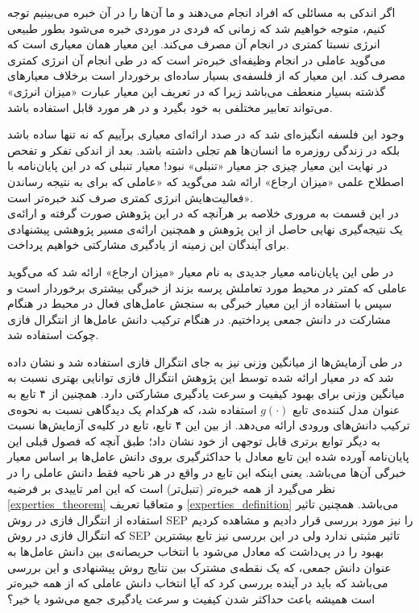 اگر اندکی به مسائلی که افراد انجام می‌دهند و ما آن‌ها را در آن خبره می‌بینیم توجه کنیم، متوجه خواهیم شد که زمانی که فردی در موردی خبره می‌شود بطور طبیعی انرژی نسبتا کمتری در انجام آن مصرف می‌کند. این معیار همان معیاری است که می‌گوید عاملی در انجام وظیفه‌ای خبره‌تر است که در طی انجام آن انرژی کمتری مصرف کند. این معیار که از فلسفه‌ی بسیار ساده‌ای برخوردار است برخلاف معیار‌های گذشته بسیار منعطف می‌باشد زیرا که در تعریف این معیار عبارت «میزان انرژی» می‌تواند تعابیر مختلفی به خود بگیرد و در هر مورد قابل استفاده باشد.

وجود این فلسفه انگیزه‌ای شد که در صدد ارائه‌ای معیاری برآییم که نه تنها ساده باشد بلکه در زندگی روزمره ما انسان‌ها هم تجلی داشته باشد. بعد از اندکی تفکر و تفحص در نهایت این معیار چیزی جز معیار «تنبلی» نبود! معیار تنبلی که در این پایان‌نامه با اصطلاح علمی «میزان ارجاع» ارائه شد می‌گوید که «عاملی که برای به نتیجه رساندن فعالیت‌هایش انرژی کمتری صرف کند خبره‌تر است».\\
در این قسمت به مروری خلاصه بر هرآنچه که در این پژوهش صورت گرفته و ارائه‌ی یک نتیجه‌گیری نهایی حاصل از این پژوهش و همچنین ارائه‌ی مسیر پژوهشی پیشنهادی برای آیندگان این زمینه از یادگیری مشارکتی خواهیم پرداخت.

در طی این پایان‌نامه معیار جدیدی به نام معیار «میزان ارجاع» ارائه شد که می‌گوید عاملی که کمتر در محیط مورد تعاملش پرسه بزند از خبرگی بیشتری برخوردار است و سپس با استفاده از این معیار خبرگی به سنجش عامل‌های فعال در محیط در هنگام مشارکت در دانش جمعی پرداختیم. در هنگام ترکیب دانش عامل‌ها از انتگرال فازی چوکت استفاده شد.

در طی آزمایش‌ها از میانگین وزنی نیز به جای انتگرال فازی استفاده شد و نشان داده شد که در معیار ارائه شده توسط این پژوهش انتگرال فازی توانایی بهتری نسبت به میانگین وزنی برای بهبود کیفیت و سرعت یادگیری مشارکتی دارد. همچنین از ۴ تابع به عنوان مدل کننده‌ی تابع $g(\cdot)$ استفاده شد، که هرکدام یک دیدگاهی نسبت به نحوه‌ی ترکیب دانش‌های ورودی ارائه می‌دهد. از بین این ۴ تابع، تابع  در کلیه‌ی آزمایش‌ها نسبت به دیگر توابع برتری قابل توجهی از خود نشان داد؛ طبق آنچه که فصول قبلی این پایان‌نامه آورده شده این تابع معادل با حداکثرگیری بروی دانش عامل‌ها بر اساس معیار خبرگی آن‌ها می‌باشد. یعنی اینکه این تابع در واقع در هر ناحیه فقط دانش عاملی را در نظر می‌گیرد از همه خبره‌تر (تنبل‌تر) است که این امر تاییدی بر فرضیه
\ref{experties_theorem}
و متعاقبا تعریف
\ref{experties_definition}
می‌باشد. همچنین تاثیر استفاده از انتگرال فازی در روش SEP را نیز مورد بررسی قرار دادیم و مشاهده کردیم که انتگرال فازی در روش SEP تاثیر مثبتی ندارد ولی در این بررسی نیز تابع  بیشترین بهبود را در پی‌داشت که معادل می‌شود با انتخاب حریصانه‌ی بین دانش عامل‌ها به عنوان دانش جمعی، که یک نقطه‌ی مشترک بین نتایج روش پیشنهادی و این بررسی می‌باشد که باید در آینده بررسی کرد که آیا انتخاب دانش عاملی که از همه خبره‌تر است همیشه باعث حداکثر شدن کیفیت و سرعت یادگیری جمع می‌شود یا خیر؟

